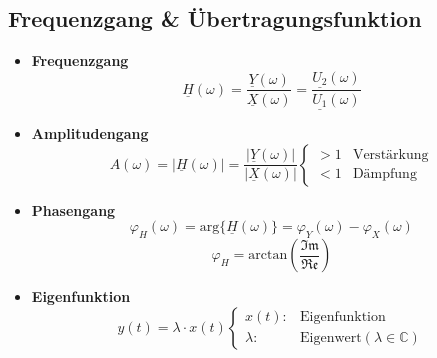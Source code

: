 \subsection{Frequenzgang \& \"Ubertragungsfunktion}
\begin{mdframed}[style=exercise]
  \begin{itemize}
      \item{\textbf{Frequenzgang}}\\
          \[
              \underline{H}(\omega) =
              \frac{\underline{Y}(\omega)}{\underline{X}(\omega)} =
              \frac{\underline{U_2}(\omega)}{\underline{U_1}(\omega)}
          \]
      \item{\textbf{Amplitudengang}}\\
          \[
              A(\omega) = |\underline{H}(\omega)| =
              \frac{|\underline{Y}(\omega)|}{|\underline{X}(\omega)|}
              \begin{cases}
                  > 1 & \text{Verst\"arkung}\\
                  < 1 & \text{D\"ampfung}
              \end{cases}
          \]
      \item{\textbf{Phasengang}}\\
          \[
              \varphi_H(\omega) = \text{arg}\{\underline{H}(\omega)\} =
              \varphi_Y(\omega) - \varphi_X(\omega)
          \]
          \[
              \varphi_H = \text{arctan}\left(\frac{\mathfrak{Im}}{\mathfrak{Re}}\right)
          \]
      \item{\textbf{Eigenfunktion}}\\
          \[
              y(t) = \lambda\cdot x(t)
              \begin{cases}
                  x(t): & \text{Eigenfunktion}\\
                  \lambda: & \text{Eigenwert}(\lambda\in\mathbb{C})
              \end{cases}
          \]
  \end{itemize}
\end{mdframed}
